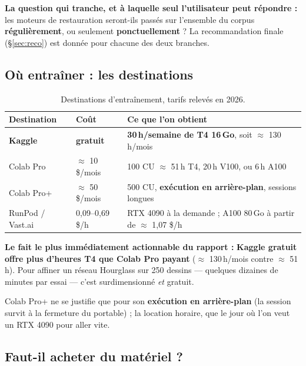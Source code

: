 \documentclass[11pt,a4paper]{article}
\newcommand{\aretenir}[1]{%
  \par\medskip
  \noindent\colorbox{encadre}{%
    \begin{minipage}{\dimexpr\linewidth-2\fboxsep}
      \vspace{2pt}#1\vspace{2pt}
    \end{minipage}}%
  \par\medskip
}
\begin{document}
\aretenir{\textbf{La question qui tranche, et à laquelle seul l'utilisateur peut
répondre :} les moteurs de restauration seront-ils passés sur l'ensemble du
corpus \textbf{régulièrement}, ou seulement \textbf{ponctuellement} ? La
recommandation finale (§\ref{sec:reco}) est donnée pour chacune des deux
branches.}

\subsection{Où entraîner : les destinations}
\label{sec:destinations}

\begin{table}[h]
\centering
\small
\begin{tabularx}{\textwidth}{llY}
\toprule
\textbf{Destination} & \textbf{Coût} & \textbf{Ce que l'on obtient} \\
\midrule
\textbf{Kaggle} & \textbf{gratuit} &
\textbf{30\,h/semaine de T4 16\,Go}, soit $\approx$ 130\,h/mois \\
\addlinespace
Colab Pro & $\approx$ 10 \$/mois &
100 CU $\approx$ 51\,h T4, 20\,h V100, ou 6\,h A100 \\
\addlinespace
Colab Pro+ & $\approx$ 50 \$/mois &
500 CU, \textbf{exécution en arrière-plan}, sessions longues \\
\addlinespace
RunPod / Vast.ai & 0,09--0,69 \$/h &
RTX 4090 à la demande ; A100 80\,Go à partir de $\approx$ 1,07 \$/h \\
\bottomrule
\end{tabularx}
\caption{Destinations d'entraînement, tarifs relevés en 2026.}
\end{table}

\aretenir{\textbf{Le fait le plus immédiatement actionnable du rapport :}
\textbf{Kaggle gratuit offre plus d'heures T4 que Colab Pro payant}
($\approx$ 130\,h/mois contre $\approx$ 51\,h). Pour affiner un réseau Hourglass
sur 250 dessins — quelques dizaines de minutes par essai — c'est surdimensionné
\emph{et} gratuit.}

Colab Pro+ ne se justifie que pour son \textbf{exécution en arrière-plan} (la
session survit à la fermeture du portable) ; la location horaire, que le jour où
l'on veut un RTX 4090 pour aller vite.

\subsection{Faut-il acheter du matériel ?}
\label{sec:materiel}
\end{document}
